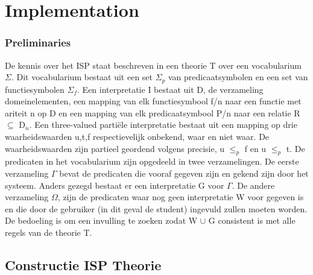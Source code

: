 \chapter{Implementation}
\label{cha:implementation}

\subsection{Preliminaries}
De kennis over het ISP staat beschreven in een theorie T over een vocabularium $\Sigma$. Dit vocabularium bestaat uit een set $\Sigma_{p}$ van predicaatsymbolen en een set van functiesymbolen $\Sigma_{f}$. Een interpretatie I bestaat uit D, de verzameling domeinelementen, een mapping van elk functiesymbool f/n naar een functie met ariteit n op D en een mapping van elk predicaatsymbool P/n naar een relatie R $\subseteq$ D$_{n}$. Een three-valued parti\"{e}le interpretatie bestaat uit een mapping op drie waarheidswaarden {u,t,f} respectievelijk onbekend, waar en niet waar. De waarheidswaarden zijn partieel geordend volgens precisie, u $\leq_{p}$ f en u $\leq_{p}$ t. De predicaten in het vocabularium zijn opgedeeld in twee verzamelingen. De eerste verzameling $\Gamma$ bevat de predicaten die vooraf gegeven zijn en gekend zijn door het systeem. Anders gezegd bestaat er een interpretatie G voor $\Gamma$. De andere verzameling $\Omega$, zijn de predicaten waar nog geen interpretatie W voor gegeven is en die door de gebruiker (in dit geval de student) ingevuld zullen moeten worden. De bedoeling is om een invulling te zoeken zodat W $\cup$ G consistent is met alle regels van de theorie T.

\section{Constructie ISP Theorie}

